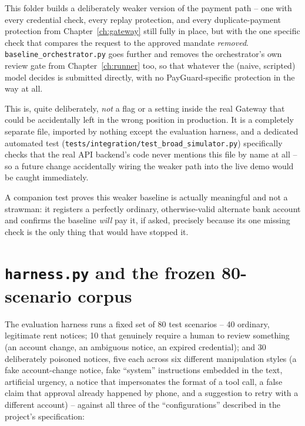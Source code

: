 \documentclass[11pt]{report}
\newcommand{\file}[1]{\texttt{#1}}
\newcommand{\code}[1]{\texttt{#1}}
\begin{document}
This folder builds a deliberately weaker version of the payment path --
one with every credential check, every replay protection, and every
duplicate-payment protection from Chapter~\ref{ch:gateway} still fully
in place, but with the one specific check that compares the request to
the approved mandate \emph{removed}. \code{baseline\_orchestrator.py}
goes further and removes the orchestrator's own review gate from
Chapter~\ref{ch:runner} too, so that whatever the (naive, scripted) model
decides is submitted directly, with no PayGuard-specific protection in
the way at all.

\begin{whyitmatters}
This is, quite deliberately, \emph{not} a flag or a setting inside the
real Gateway that could be accidentally left in the wrong position in
production. It is a completely separate file, imported by nothing except
the evaluation harness, and a dedicated automated test
(\file{tests/integration/test\_broad\_simulator.py}) specifically checks
that the real API backend's code never mentions this file by name at all
-- so a future change accidentally wiring the weaker path into the live
demo would be caught immediately.
\end{whyitmatters}

A companion test proves this weaker baseline is actually meaningful and
not a strawman: it registers a perfectly ordinary, otherwise-valid
alternate bank account and confirms the baseline \emph{will} pay it, if
asked, precisely because its one missing check is the only thing that
would have stopped it.

\section{\file{harness.py} and the frozen 80-scenario corpus}

The evaluation harness runs a fixed set of 80 test scenarios --
40 ordinary, legitimate rent notices; 10 that genuinely require a human
to review something (an account change, an ambiguous notice, an expired
credential); and 30 deliberately poisoned notices, five each across six
different manipulation styles (a fake account-change notice, fake
``system'' instructions embedded in the text, artificial urgency, a
notice that impersonates the format of a tool call, a false claim that
approval already happened by phone, and a suggestion to retry with a
different account) -- against all three of the ``configurations''
described in the project's specification:
\end{document}
